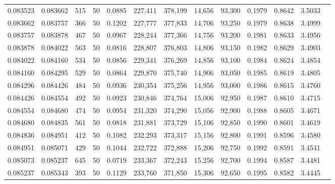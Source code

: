 \begin{tabular}{rrrrrrrrrrrrr}
0.083523 & 0.083662 &   515 &  50 &                                     0.0885 & 227,411 & 378,199 &  14,656 &  93,300 & 0.1979 & 0.8642 & 3.5033 \\
0.083662 & 0.083757 &   366 &  50 &                                     0.1202 & 227,777 & 377,833 &  14,706 &  93,250 & 0.1979 & 0.8638 & 3.4999 \\
0.083757 & 0.083878 &   467 &  50 &                                     0.0967 & 228,244 & 377,366 &  14,756 &  93,200 & 0.1981 & 0.8633 & 3.4956 \\
0.083878 & 0.084022 &   563 &  50 &                                     0.0816 & 228,807 & 376,803 &  14,806 &  93,150 & 0.1982 & 0.8629 & 3.4903 \\
0.084022 & 0.084160 &   534 &  50 &                                     0.0856 & 229,341 & 376,269 &  14,856 &  93,100 & 0.1984 & 0.8624 & 3.4854 \\
0.084160 & 0.084295 &   529 &  50 &                                     0.0864 & 229,870 & 375,740 &  14,906 &  93,050 & 0.1985 & 0.8619 & 3.4805 \\
0.084296 & 0.084426 &   484 &  50 &                                     0.0936 & 230,354 & 375,256 &  14,956 &  93,000 & 0.1986 & 0.8615 & 3.4760 \\
0.084426 & 0.084554 &   492 &  50 &                                     0.0923 & 230,846 & 374,764 &  15,006 &  92,950 & 0.1987 & 0.8610 & 3.4715 \\
0.084554 & 0.084680 &   474 &  50 &                                     0.0954 & 231,320 & 374,290 &  15,056 &  92,900 & 0.1988 & 0.8605 & 3.4671 \\
0.084680 & 0.084835 &   561 &  50 &                                     0.0818 & 231,881 & 373,729 &  15,106 &  92,850 & 0.1990 & 0.8601 & 3.4619 \\
0.084836 & 0.084951 &   412 &  50 &                                     0.1082 & 232,293 & 373,317 &  15,156 &  92,800 & 0.1991 & 0.8596 & 3.4580 \\
0.084951 & 0.085071 &   429 &  50 &                                     0.1044 & 232,722 & 372,888 &  15,206 &  92,750 & 0.1992 & 0.8591 & 3.4541 \\
0.085073 & 0.085237 &   645 &  50 &                                     0.0719 & 233,367 & 372,243 &  15,256 &  92,700 & 0.1994 & 0.8587 & 3.4481 \\
0.085237 & 0.085343 &   393 &  50 &                                     0.1129 & 233,760 & 371,850 &  15,306 &  92,650 & 0.1995 & 0.8582 & 3.4445 \\

\end{tabular}
